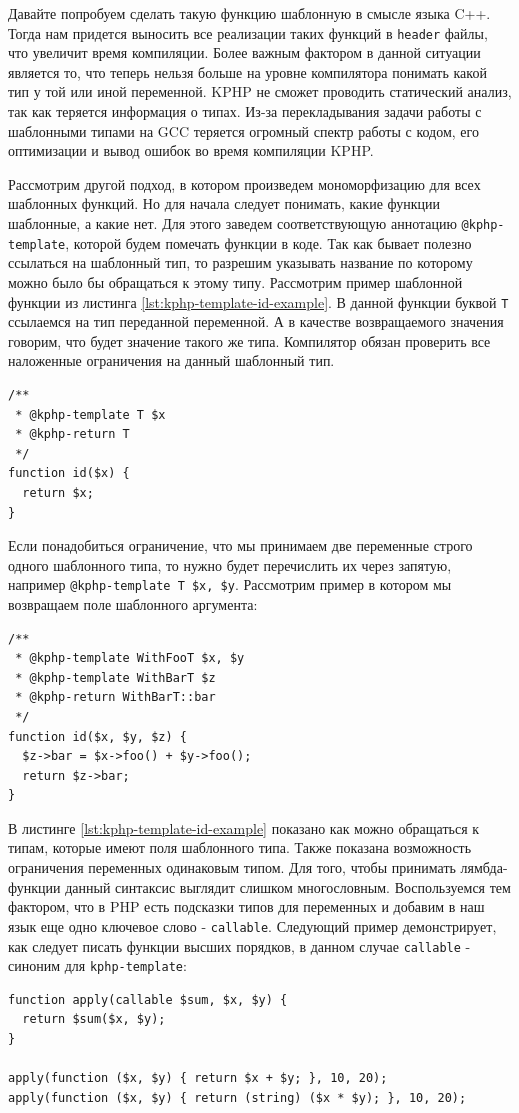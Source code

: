 Давайте попробуем сделать такую функцию шаблонную в смысле языка C++.
Тогда нам придется выносить все реализации таких функций в \verb|header| файлы, что увеличит время компиляции.
Более важным фактором в данной ситуации является то, что теперь нельзя больше на уровне компилятора понимать какой тип у той или иной переменной.
KPHP не сможет проводить статический анализ, так как теряется информация о типах.
Из-за перекладывания задачи работы с шаблонными типами на GCC \cite{gcc} теряется огромный спектр работы с кодом, его оптимизации и вывод ошибок во время компиляции KPHP.

Рассмотрим другой подход, в котором произведем мономорфизацию для всех шаблонных функций.
Но для начала следует понимать, какие функции шаблонные, а какие нет.
Для этого заведем соответствующую аннотацию \verb|@kphp-template|, которой будем помечать функции в коде.
Так как бывает полезно ссылаться на шаблонный тип, то разрешим указывать название по которому можно было бы обращаться к этому типу.
Рассмотрим пример шаблонной функции из листинга \ref{lst:kphp-template-id-example}.
В данной функции буквой \verb|T| ссылаемся на тип переданной переменной.
А в качестве возвращаемого значения говорим, что будет значение такого же типа.
Компилятор обязан проверить все наложенные ограничения на данный шаблонный тип.
\begin{lstlisting}[caption={Пример функции id, с применением шаблонов},label={lst:kphp-template-id-example}]
/**
 * @kphp-template T $x
 * @kphp-return T
 */
function id($x) {
  return $x;
}
\end{lstlisting}

Если понадобиться ограничение, что мы принимаем две переменные строго одного шаблонного типа, то нужно будет перечислить их через запятую, например \verb|@kphp-template T $x, $y|.
Рассмотрим пример в котором мы возвращаем поле шаблонного аргумента:
\begin{lstlisting}[caption={Пример функции id, с применением шаблонов},label={lst:kphp-template-id-example}]
/**
 * @kphp-template WithFooT $x, $y
 * @kphp-template WithBarT $z
 * @kphp-return WithBarT::bar
 */
function id($x, $y, $z) {
  $z->bar = $x->foo() + $y->foo();
  return $z->bar;
}
\end{lstlisting}

В листинге \ref{lst:kphp-template-id-example} показано как можно обращаться к типам, которые имеют поля шаблонного типа.
Также показана возможность ограничения переменных одинаковым типом.
Для того, чтобы принимать лямбда-функции данный синтаксис выглядит слишком многословным.
Воспользуемся тем фактором, что в PHP есть подсказки типов для переменных и добавим в наш язык еще одно ключевое слово - \verb|callable|.
Следующий пример демонстрирует, как следует писать функции высших порядков, в данном случае \verb|callable| - синоним для \verb|kphp-template|:
\begin{lstlisting}[caption={Пример использования ключевого слова callable},label={lst:callable_support}]
function apply(callable $sum, $x, $y) {
  return $sum($x, $y);
}

apply(function ($x, $y) { return $x + $y; }, 10, 20);
apply(function ($x, $y) { return (string) ($x * $y); }, 10, 20);
\end{lstlisting}

